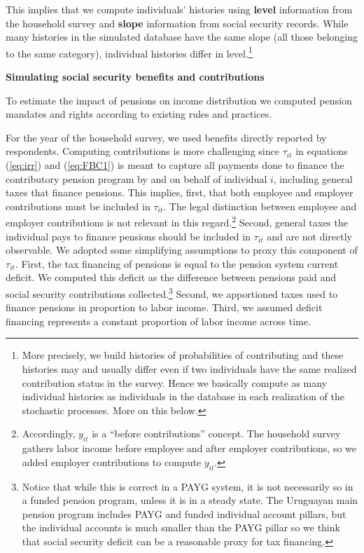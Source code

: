 \documentclass{article}
\begin{document}
This implies that we compute individuals' histories using \textbf{level}  information from the household survey and \textbf{slope} information from social security records. While many histories in the simulated database have the same slope (all those belonging to the same category), individual histories differ in level.\footnote{More precisely, we build histories of probabilities of contributing and these histories may and usually differ even if two individuals have the same realized contribution status in the survey. Hence we basically compute as many individual histories as individuals in the database in each realization of the stochastic processes.  More on this below. } 

\textbf{Simulating social security benefits and contributions}           

To estimate the impact of pensions on income distribution we computed pension mandates and rights according to existing rules and practices. 

For the year of the household survey, we used benefits directly reported by respondents. Computing contributions is more challenging since $\tau_{it}$ in equations (\ref{eq:irr}) and (\ref{eq:FBC1}) is meant to capture all payments done  to finance the contributory pension program by and on behalf of individual $i$, including general taxes that finance pensions.  This implies, first, that both  employee and employer contributions must be included in $\tau_{it}$. The legal distinction between employee and employer contributions is not relevant in this regard.\footnote{Accordingly, $y_{it}$ is a ``before contributions'' concept. The household survey gathers labor income before employee and after employer contributions, so we added employer contributions to compute $y_{it}$.} Second, general taxes the individual pays to finance pensions should be included in $\tau_{it}$ and are not directly observable. We adopted some simplifying assumptions to proxy this component of $\tau_{it}$. First, the tax financing of pensions is equal to the pension system current deficit. We  computed this deficit  as the difference between pensions paid and social security contributions collected.\footnote{ Notice that while this is correct in a PAYG system, it is not necessarily so in a funded pension program, unless it is in a steady state. The Uruguayan main pension program includes  PAYG and  funded individual account pillars, but the individual accounts is much smaller than the PAYG pillar so we think that social security deficit can be a reasonable proxy for tax financing.} Second, we apportioned taxes used to finance pensions in proportion to labor income. Third, we assumed deficit financing represents a constant proportion of labor income across time.
\end{document}
